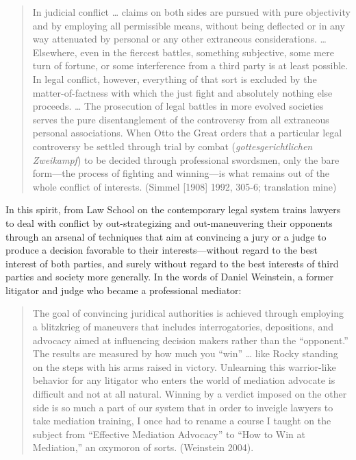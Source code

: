 \begin{quote}
In judicial conflict \ldots{} claims on both sides are pursued with pure objectivity and by employing all permissible means, without being deflected or in any way attenuated by personal or any other extraneous considerations. \ldots{} Elsewhere, even in the fiercest battles, something subjective, some mere turn of fortune, or some interference from a third party is at least possible. In legal conflict, however, everything of that sort is excluded by the matter-of-factness with which the just fight and absolutely nothing else proceeds. \ldots{} The prosecution of legal battles in more evolved societies serves the pure disentanglement of the controversy from all extraneous personal associations. When Otto the Great orders that a particular legal controversy be settled through trial by combat (\emph{gottesgerichtlichen Zweikampf}) to be decided through professional swordsmen, only the bare form---the process of fighting and winning---is what remains out of the whole conflict of interests. (Simmel [1908] 1992, 305-6; translation mine)
\end{quote}

In this spirit, from Law School on the contemporary legal system trains lawyers to deal with conflict by out-strategizing and out-maneuvering their opponents through an arsenal of techniques that aim at convincing a jury or a judge to produce a decision favorable to their interests---without regard to the best interest of both parties, and surely without regard to the best interests of third parties and society more generally. In the words of Daniel Weinstein, a former litigator and judge who became a professional mediator:

\begin{quote}
The goal of convincing juridical authorities is achieved through employing a blitzkrieg of maneuvers that includes interrogatories, depositions, and advocacy aimed at influencing decision makers rather than the ``opponent.'' The results are measured by how much you ``win'' \ldots{} like Rocky standing on the steps with his arms raised in victory. Unlearning this warrior-like behavior for any litigator who enters the world of mediation advocate is difficult and not at all natural. Winning by a verdict imposed on the other side is so much a part of our system that in order to inveigle lawyers to take mediation training, I once had to rename a course I taught on the subject from ``Effective Mediation Advocacy'' to ``How to Win at Mediation,'' an oxymoron of sorts. (Weinstein 2004).
\end{quote}

